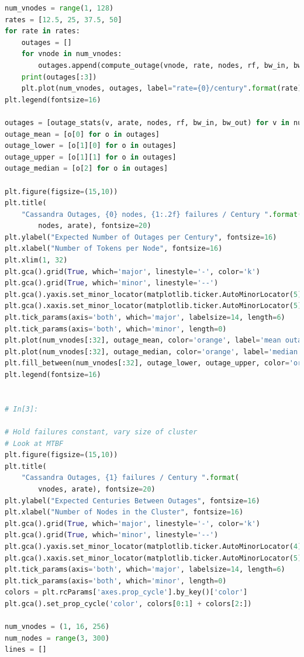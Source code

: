 \documentclass{article}
\begin{document}
\begin{lstlisting}[language=Python]
num_vnodes = range(1, 128)
rates = [12.5, 25, 37.5, 50]
for rate in rates:
    outages = []
    for vnode in num_vnodes:
        outages.append(compute_outage(vnode, rate, nodes, rf, bw_in, bw_out))
    print(outages[:3])
    plt.plot(num_vnodes, outages, label="rate={0}/century".format(rate))
plt.legend(fontsize=16)

outages = [outage_stats(v, arate, nodes, rf, bw_in, bw_out) for v in num_vnodes[:32]]
outage_mean = [o[0] for o in outages]
outage_lower = [o[1][0] for o in outages]
outage_upper = [o[1][1] for o in outages]
outage_median = [o[2] for o in outages]

plt.figure(figsize=(15,10))
plt.title(
    "Cassandra Outages, {0} nodes, {1:.2f} failures / Century ".format(
        nodes, arate), fontsize=20)
plt.ylabel("Expected Number of Outages per Century", fontsize=16)
plt.xlabel("Number of Tokens per Node", fontsize=16)
plt.xlim(1, 32)
plt.gca().grid(True, which='major', linestyle='-', color='k')
plt.gca().grid(True, which='minor', linestyle='--')
plt.gca().yaxis.set_minor_locator(matplotlib.ticker.AutoMinorLocator(5))
plt.gca().xaxis.set_minor_locator(matplotlib.ticker.AutoMinorLocator(5))
plt.tick_params(axis='both', which='major', labelsize=14, length=6)
plt.tick_params(axis='both', which='minor', length=0)
plt.plot(num_vnodes[:32], outage_mean, color='orange', label='mean outages')
plt.plot(num_vnodes[:32], outage_median, color='orange', label='median outages', linestyle='--')
plt.fill_between(num_vnodes[:32], outage_lower, outage_upper, color='orange', alpha=0.05, label='IQR')
plt.legend(fontsize=16)


# In[3]:

# Hold failures constant, vary size of cluster
# Look at MTBF
plt.figure(figsize=(15,10))
plt.title(
    "Cassandra Outages, {1} failures / Century ".format(
        vnodes, arate), fontsize=20)
plt.ylabel("Expected Centuries Between Outages", fontsize=16)
plt.xlabel("Number of Nodes in the Cluster", fontsize=16)
plt.gca().grid(True, which='major', linestyle='-', color='k')
plt.gca().grid(True, which='minor', linestyle='--')
plt.gca().yaxis.set_minor_locator(matplotlib.ticker.AutoMinorLocator(4))
plt.gca().xaxis.set_minor_locator(matplotlib.ticker.AutoMinorLocator(5))
plt.tick_params(axis='both', which='major', labelsize=14, length=6)
plt.tick_params(axis='both', which='minor', length=0)
colors = plt.rcParams['axes.prop_cycle'].by_key()['color']
plt.gca().set_prop_cycle('color', colors[0:1] + colors[2:])

num_vnodes = (1, 16, 256)
num_nodes = range(3, 300)
lines = []


\end{lstlisting}
\end{document}
